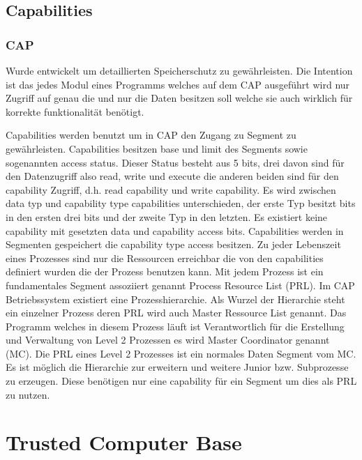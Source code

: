 \documentclass[9pt,technote]{IEEEtran}
\begin{document}
    \subsection{Capabilities} \label{subsec:capability}
      
      \subsubsection{CAP}
		     Wurde entwickelt um detaillierten Speicherschutz zu gew\"ahrleisten. Die Intention ist das jedes Modul eines Programms welches auf dem CAP ausgef\"uhrt wird
		     nur Zugriff auf genau die und nur die Daten besitzen soll welche sie auch wirklich f\"ur korrekte funktionalit\"at ben\"otigt.
		     
		     
		     Capabilities werden benutzt um in CAP den Zugang zu Segment zu gew\"ahrleisten.
		     Capabilities besitzen base und limit des Segments sowie sogenannten access status. Dieser Status
		     besteht aus 5 bits, drei davon sind f\"ur den Datenzugriff also read, write und execute die anderen beiden sind f\"ur den capability Zugriff,
		     d.h. read capability und write capability. Es wird zwischen data typ und capability type capabilities unterschieden,
		     der erste Typ besitzt bits in den ersten drei bits und
		     der zweite Typ in den letzten. Es existiert keine capability mit gesetzten data und capability access bits. Capabilities werden in Segmenten gespeichert die
		     capability type access besitzen. Zu jeder Lebenszeit eines Prozesses sind nur die Ressourcen erreichbar die von den
		     capabilities definiert wurden die der Prozess
		     benutzen kann. Mit jedem Prozess ist ein fundamentales Segment assoziiert genannt Process Resource List (PRL). 
		     Im CAP Betriebssystem existiert eine Prozesshierarchie.
		     Als Wurzel der Hierarchie steht ein einzelner Prozess deren PRL wird auch Master Ressource List genannt.    
		     Das Programm welches in diesem Prozess l\"auft ist Verantwortlich f\"ur die Erstellung und Verwaltung von Level 2 
		     Prozessen es wird Master Coordinator genannt (MC).
		     Die PRL eines Level 2 Prozesses ist ein normales Daten Segment vom MC. Es ist m\"oglich die Hierarchie zur erweitern und weitere Junior
		     bzw. Subprozesse zu erzeugen.
         Diese ben\"otigen nur eine capability f\"ur ein Segment um dies als PRL zu nutzen.
  \section{Trusted Computer Base}
\end{document}
